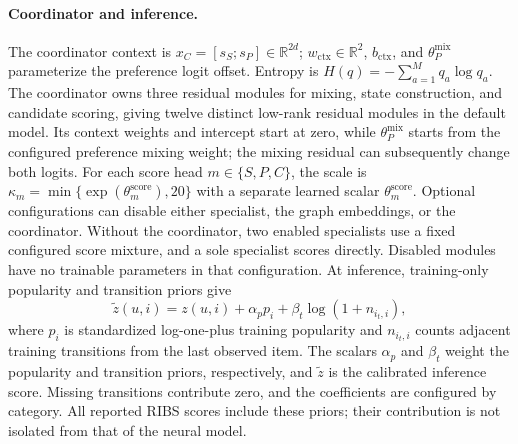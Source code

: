 ﻿\documentclass[sigconf,anonymous,review]{acmart}
\begin{document}
\paragraph{Coordinator and inference.}
The coordinator context is $x_C=[s_S;s_P]\in\mathbb R^{2d}$; $w_{\mathrm{ctx}}\in\mathbb R^2$, $b_{\mathrm{ctx}}$, and $\theta_P^{\mathrm{mix}}$ parameterize the preference logit offset. Entropy is $H(q)=-\sum_{a=1}^{M}q_a\log q_a$. The coordinator owns three residual modules for mixing, state construction, and candidate scoring, giving twelve distinct low-rank residual modules in the default model. Its context weights and intercept start at zero, while $\theta_P^{\mathrm{mix}}$ starts from the configured preference mixing weight; the mixing residual can subsequently change both logits. For each score head $m\in\{S,P,C\}$, the scale is $\kappa_m=\min\{\exp(\theta_m^{\mathrm{score}}),20\}$ with a separate learned scalar $\theta_m^{\mathrm{score}}$. Optional configurations can disable either specialist, the graph embeddings, or the coordinator. Without the coordinator, two enabled specialists use a fixed configured score mixture, and a sole specialist scores directly. Disabled modules have no trainable parameters in that configuration. At inference, training-only popularity and transition priors give
\begin{equation}
 \widetilde z(u,i)=z(u,i)+\alpha_p p_i+\beta_t\log(1+n_{i_t,i}),
\end{equation}
where $p_i$ is standardized log-one-plus training popularity and $n_{i_t,i}$ counts adjacent training transitions from the last observed item. The scalars $\alpha_p$ and $\beta_t$ weight the popularity and transition priors, respectively, and $\widetilde z$ is the calibrated inference score. Missing transitions contribute zero, and the coefficients are configured by category. All reported RIBS scores include these priors; their contribution is not isolated from that of the neural model.
\end{document}

